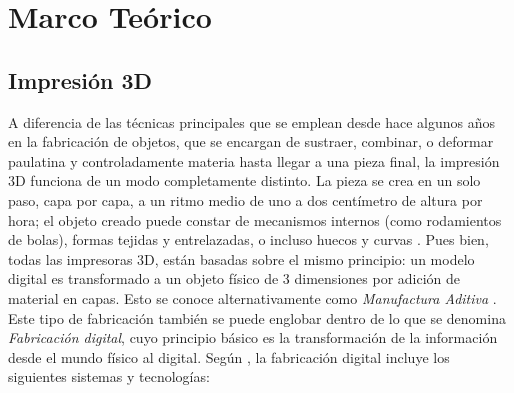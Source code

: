 
\chapter{Marco Te\'orico}
\label{cap:preliminares}

\section{Impresión 3D}

 A diferencia de las técnicas principales que se emplean desde hace algunos años en la fabricación de objetos, que se encargan de sustraer, combinar, o deformar paulatina y controladamente materia hasta llegar a una pieza final, la impresión 3D funciona de un modo completamente distinto. La pieza se crea en un solo paso, capa por capa, a un ritmo medio de uno a dos centímetro de altura por hora; el objeto creado puede constar de mecanismos internos (como rodamientos de bolas), formas tejidas y entrelazadas, o incluso huecos y curvas \citep{Berchon2014}. Pues bien, todas las impresoras 3D, están basadas sobre el mismo principio: un modelo digital es transformado a un objeto físico de 3 dimensiones por adición de material en capas. Esto se conoce alternativamente como \textit{Manufactura Aditiva} \citep{tresdhub2018}. Este tipo de fabricación también se puede englobar dentro de lo que se denomina \textit{Fabricación digital}, cuyo principio básico es la transformación de la información  desde el mundo físico al digital. Según \citep{jorquera2016}, la fabricación digital incluye los siguientes sistemas y tecnologías:\\
 
